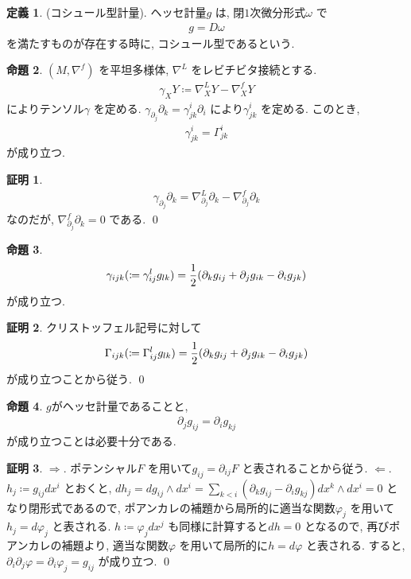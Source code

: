 \documentclass[10pt, fleqn, label-section=none]{bxjsarticle}
\theoremstyle{definition}
\newtheorem{dfn}{定義}[section]
\newtheorem{prop}[dfn]{命題}
\newtheorem*{pf*}{証明}
\newcommand{\paren}[1]{\mleft( #1\mright )}
\newcommand{\naraba}{\Rightarrow}
\newcommand{\gyaku}{\Leftarrow}
\renewcommand{\;}{\, ; \,}
\begin{document}
\begin{dfn}(コシュール型計量). ヘッセ計量$g$ は, 閉$1$次微分形式$\omega$ で
\begin{align*} g = D\omega \end{align*}
を満たすものが存在する時に, コシュール型であるという. 
\end{dfn}

\begin{prop}$(M, \nabla^f)$ を平坦多様体, $\nabla^L$ をレビチビタ接続とする. 
\begin{align*} \gamma_X Y \coloneqq \nabla^L _X Y - \nabla^f _X Y \end{align*}
によりテンソル$\gamma$ を定める. 
$\gamma _{\partial _j}  \partial_k = \gamma^i_{jk} \partial_i$ により$\gamma^i_{jk}$ を定める. このとき, 
\begin{align*} \gamma^i_{jk} = \Gamma^i_{jk}\end{align*}
が成り立つ. 
\end{prop}
\begin{pf*}
\begin{align*} \gamma_{\partial_j} \partial_k = \nabla^L _{\partial_j} \partial_k - \nabla^f_{\partial_j} \partial_k   \end{align*}
なのだが, $\nabla^f_{\partial_j} \partial_k = 0$ である. 
\qed
\end{pf*}

\begin{prop}
\begin{align*} \gamma_{ijk} (\coloneqq \gamma^{l}_{ij} g_{lk} ) = \frac{1}{2} \paren{\partial_k g_{ij} + \partial_j g_{ik} - \partial_i g_{jk} } \end{align*} 
が成り立つ. 
\end{prop}
\begin{pf*}クリストッフェル記号に対して
\begin{align*} \Gamma_{ijk} (\coloneqq \Gamma^{l}_{ij} g_{lk} ) = \frac{1}{2} \paren{\partial_k g_{ij} + \partial_j g_{ik} - \partial_i g_{jk} } \end{align*} 
が成り立つことから従う. 
\qed
\end{pf*}

\begin{prop}
$g$がヘッセ計量であることと, 
\begin{align*} \partial_j g_{ij} = \partial_i g_{kj} \end{align*}
が成り立つことは必要十分である. 
\end{prop}
\begin{pf*}
$\naraba$. ポテンシャル$F$ を用いて$g_{ij} = \partial_{ij} F$ と表されることから従う. $\gyaku$. $h_j \coloneqq g_{ij} dx^i$ とおくと, $dh_j = dg_{ij} \wedge dx^i = \sum_{k <i} (\partial_k g_{ij} - \partial_i g_{kj})dx^k \wedge dx^i = 0$ となり閉形式であるので, ポアンカレの補題から局所的に適当な関数$\varphi_j$ を用いて$h_j = d\varphi_j$ と表される. $h \coloneqq \varphi_j dx^j$ も同様に計算すると$dh = 0$ となるので, 再びポアンカレの補題より, 適当な関数$\varphi$ を用いて局所的に$h = d \varphi$ と表される. すると, $\partial_i \partial_j \varphi = \partial_i \varphi_j = g_{ij}$ が成り立つ. 
\qed
\end{pf*}
\end{document}
